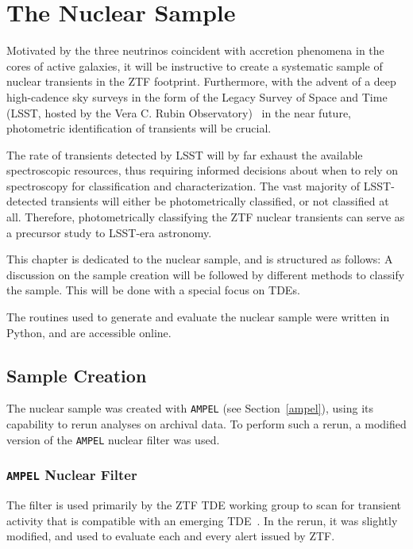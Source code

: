 \chapter{The Nuclear Sample}\label{nucsam}
Motivated by the three neutrinos coincident with accretion phenomena in the cores of active galaxies, it will be instructive to create a systematic sample of nuclear transients in the ZTF footprint. Furthermore, with the advent of a deep high-cadence sky surveys in the form of the Legacy Survey of Space and Time (LSST, hosted by the Vera C. Rubin Observatory)~ in the near future, photometric identification of transients will be crucial.

The rate of transients detected by LSST will by far exhaust the available spectroscopic resources, thus requiring informed decisions about when to rely on spectroscopy for classification and characterization. The vast majority of LSST-detected transients will either be photometrically classified, or not classified at all. Therefore, photometrically classifying the ZTF nuclear transients can serve as a precursor study to LSST-era astronomy.

This chapter is dedicated to the nuclear sample, and is structured as follows: A discussion on the sample creation will be followed by different methods to classify the sample. This will be done with a special focus on TDEs.

The routines used to generate and evaluate the nuclear sample were written in Python, and are accessible online.

\section{Sample Creation}
The nuclear sample was created with \texttt{AMPEL} (see Section~\ref{ampel}), using its capability to rerun analyses on archival data. To perform such a rerun, a modified version of the \texttt{AMPEL} nuclear filter was used.

\subsection{\texttt{AMPEL} Nuclear Filter}\label{nuclear_filter}

The filter is used primarily by the ZTF TDE working group to scan for transient activity that is compatible with an emerging TDE~\cite{Velzen2021a}. In the rerun, it was slightly modified, and used to evaluate each and every alert issued by ZTF.

